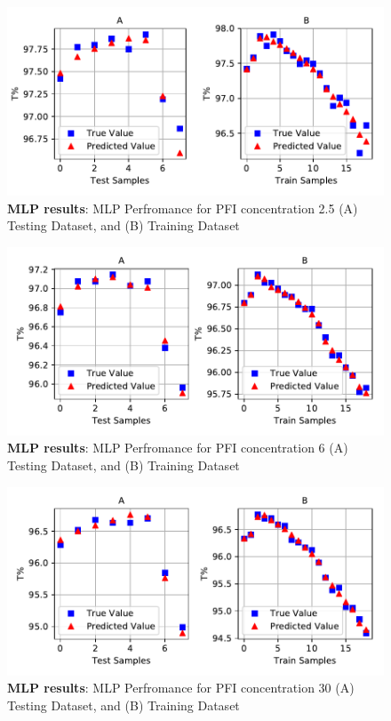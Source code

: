 \documentclass[]{article}
\begin{document}
\begin{figure}
\centering
\includegraphics{Report_files/figure-latex/transmitplot25-1.pdf}
\caption{\label{fig:transmitplot25}\textbf{MLP results}: MLP Perfromance for PFI concentration 2.5 (A) Testing Dataset, and (B) Training Dataset}
\end{figure}

\begin{figure}
\centering
\includegraphics{Report_files/figure-latex/transmitplot6-1.pdf}
\caption{\label{fig:transmitplot6}\textbf{MLP results}: MLP Perfromance for PFI concentration 6 (A) Testing Dataset, and (B) Training Dataset}
\end{figure}

\begin{figure}
\centering
\includegraphics{Report_files/figure-latex/transmitplot30-1.pdf}
\caption{\label{fig:transmitplot30}\textbf{MLP results}: MLP Perfromance for PFI concentration 30 (A) Testing Dataset, and (B) Training Dataset}
\end{figure}
\end{document}
